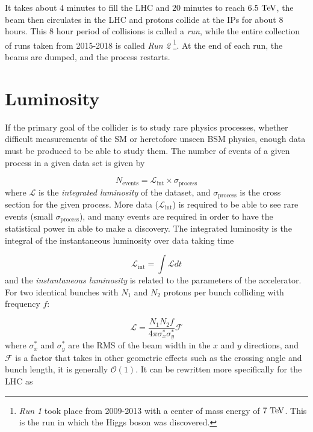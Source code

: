 It takes about $4$ minutes to fill the \ac{LHC} and $20$ minutes to reach $6.5 \TeV$, the beam then circulates in the \ac{LHC} and protons collide at the \ac{IP}s for about $8$ hours. This $8$ hour period of collisions is called a \emph{run}, while the entire collection of runs taken from 2015-2018 is called \emph{Run 2} \footnote{\emph{Run 1} took place from 2009-2013 with a center of mass energy of $7 \TeV$. This is the run in which the Higgs boson was discovered.}. At the end of each run, the beams are dumped, and the process restarts. 

\section{Luminosity}
\label{sec:lumi}

If the primary goal of the collider is to study rare physics processes, whether difficult measurements of the \ac{SM} or heretofore unseen \ac{BSM} physics, enough data must be produced to be able to study them. The number of events of a given process in a given data set is given by

\begin{equation}
N_{\textrm{events}} = \mathcal{L}_{\textrm{int}} \times \sigma_{\textrm{process}}
\label{eq:nevents_lumi}
\end{equation}
where $\mathcal{L}$ is the \emph{integrated luminosity} of the dataset, and $\sigma_{\textrm{process}}$ is the cross section for the given process. More data ($\mathcal{L}_{\textrm{int}}$) is required to be able to see rare events (small $\sigma_{\textrm{process}}$), and many events are required in order to have the statistical power in able to make a discovery. The integrated luminosity is the integral of the instantaneous luminosity over data taking time

\begin{equation}
\mathcal{L}_{\textrm{int}} = \int \mathcal{L} dt
\end{equation}
and the \emph{instantaneous luminosity} is related to the parameters of the accelerator. For two identical bunches with $N_1$ and $N_2$ protons per bunch colliding with frequency $f$:

\begin{equation}
\mathcal{L} = \frac{N_1 N_2 f}{4\pi \sigma_x^* \sigma_y^*} \mathcal{F}
\end{equation}
where $\sigma_x^*$ and  $\sigma_y^*$ are the \ac{RMS} of the beam width in the $x$ and $y$ directions, and $\mathcal{F}$ is a factor that takes in other geometric effects such as the crossing angle and bunch length, it is generally $\mathcal{O}(1)$. It can be rewritten more specifically for the \ac{LHC} as

